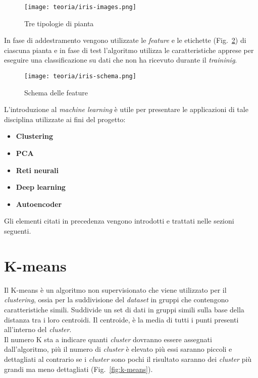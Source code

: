 \begin{figure}[!h] 
    \centering 
    \texttt{[image: teoria/iris-images.png]} 
    \caption{Tre tipologie di pianta}
    \label{fig:iris-images}
  \end{figure}
In fase di addestramento vengono utilizzate le \emph{\gls{feature}} e le etichette (Fig.~\ref{fig:iris-schema}) di ciascuna pianta e in fase di test l'algoritmo utilizza le caratteristiche apprese per eseguire una classificazione su dati che non ha ricevuto durante il \emph{traininig}.

\begin{figure}[!h] 
    \centering 
    \texttt{[image: teoria/iris-schema.png]} 
    \caption{Schema delle feature}
    \label{fig:iris-schema}
  \end{figure}
L'introduzione al \emph{machine learning} è utile per presentare le applicazioni di tale disciplina utilizzate ai fini del progetto:
\begin{itemize}
    \item \textbf{Clustering}
    \item \textbf{PCA}
    \item \textbf{Reti neurali}
    \item \textbf{Deep learning}
    \item \textbf{Autoencoder}
\end{itemize}
Gli elementi citati in precedenza vengono introdotti e trattati nelle sezioni seguenti.

\newpage

\section{K-means}
Il K-means è un algoritmo non supervisionato che viene utilizzato per il \emph{clustering}, ossia per la suddivisione del \emph{\gls{dataset}} in gruppi che contengono caratteristiche simili.
Suddivide un set di dati in gruppi simili sulla base della distanza tra i loro centroidi. 
Il centroide, è la media di tutti i punti presenti all'interno del \emph{cluster}.\\Il numero K sta a indicare quanti \emph{cluster} dovranno essere assegnati dall'algoritmo, più il numero di \emph{cluster} è elevato più essi saranno piccoli e dettagliati al contrario se i \emph{cluster} sono pochi il risultato saranno dei \emph{cluster} più grandi ma meno dettagliati (Fig.~\ref{fig:k-means}).

